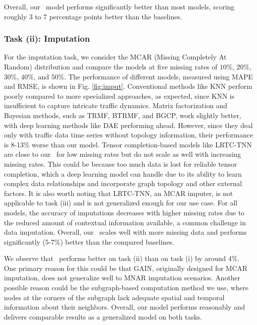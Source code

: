 Overall, our \name\ model performs significantly better than most models, scoring roughly 3 to 7 percentage points better than the baselines.

\subsubsection{Task (ii): Imputation}

For the imputation task, we consider the MCAR (Missing Completely At Random) distribution and compare the models at five missing rates of $10\%$, $20\%$, $30\%$, $40\%$, and $50\%$. The performance of different models, measured using MAPE and RMSE, is shown in Fig. \ref{fig:imput}. Conventional methods like KNN perform poorly compared to more specialized approaches, as expected, since KNN is insufficient to capture intricate traffic dynamics. Matrix factorization and Bayesian methods, such as TRMF, BTRMF, and BGCP, work slightly better, with deep learning methods like DAE performing ahead. However, since they deal only with traffic data time series without topology information, their performance is 8-13\% worse than our model. Tensor completion-based models like LRTC-TNN are close to our \name\ for low missing rates but do not scale as well with increasing missing rates. This could be because too much data is lost for reliable tensor completion, which a deep learning model can handle due to its ability to learn complex data relationships and incorporate graph topology and other external factors. It is also worth noting that LRTC-TNN, an MCAR imputer, is not applicable to task (iii) and is not generalized enough for our use case. For all models, the accuracy of imputations decreases with higher missing rates due to the reduced amount of contextual information available, a common challenge in data imputation. Overall, our \name\ scales well with more missing data and performs significantly (5-7\%) better than the compared baselines.

We observe that \name\ performs better on task (ii) than on task (i) by around 4\%. One primary reason for this could be that GAIN, originally designed for MCAR imputation, does not generalize well to MNAR imputation scenarios. Another possible reason could be the subgraph-based computation method we use, where nodes at the corners of the subgraph lack adequate spatial and temporal information about their neighbors. Overall, our model performs reasonably and delivers comparable results as a generalized model on both tasks.


